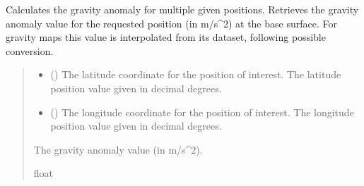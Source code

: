 \documentclass[letterpaper,10pt,english]{sphinxmanual}
\begin{document}
\begin{fulllineitems}
\begin{fulllineitems}
\label{\detokenize{modules/gravity/irish:qnav.gravity.irish.IrishSeaGravity.get_anomaly_vec}}
\pysigstartsignatures
{}
\pysigstopsignatures
\sphinxAtStartPar
Calculates the gravity anomaly for multiple given positions.
Retrieves the gravity anomaly value for the requested position
(in m/s\textasciicircum{}2) at the base surface. For gravity maps this value is
interpolated from its dataset, following possible conversion.
\begin{quote}\begin{description}
\begin{itemize}
\item {} 
\sphinxAtStartPar
{} () \textendash{} The latitude coordinate for the position of interest.
The latitude position value given in decimal degrees.

\item {} 
\sphinxAtStartPar
{} () \textendash{} The longitude coordinate for the position of interest.
The longitude position value given in decimal degrees.

\end{itemize}

\sphinxAtStartPar
The gravity anomaly value (in m/s\textasciicircum{}2).

\sphinxAtStartPar
float

\end{description}\end{quote}

\end{fulllineitems}



\end{fulllineitems}
\end{document}

